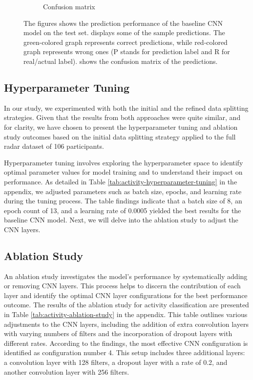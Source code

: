 \documentclass{l4proj}
\begin{document}
\begin{figure}[h]
\begin{subfigure}{0.4\textwidth}
        \caption{Confusion matrix}
        \label{fig:activity-initial-test-confusion-matrix}
    \end{subfigure}
  \caption{The figures shows the prediction performance of the baseline CNN model on the test set.  displays some of the sample predictions. The green-colored graph represents correct predictions, while red-colored graph represents wrong ones (P stands for prediction label and R for real/actual label). shows the confusion matrix of the predictions.}
  \label{fig:acitivity-initial-prediction-plots-and-confusion-matrix}
\end{figure}

\newpage

\subsection{Hyperparameter Tuning}
In our study, we experimented with both the initial and the refined data splitting strategies. Given that the results from both approaches were quite similar, and for clarity, we have chosen to present the hyperparameter tuning and ablation study outcomes based on the initial data splitting strategy applied to the full radar dataset of 106 participants.

Hyperparameter tuning involves exploring the hyperparameter space to identify optimal parameter values for model training and to understand their impact on performance. As detailed in Table \ref{tab:activity-hyperparameter-tuning} in the appendix, we adjusted parameters such as batch size, epochs, and learning rate during the tuning process. The table findings indicate that a batch size of 8, an epoch count of 13, and a learning rate of 0.0005 yielded the best results for the baseline CNN model. Next, we will delve into the ablation study to adjust the CNN layers.

\subsection{Ablation Study}
An ablation study investigates the model's performance by systematically adding or removing CNN layers. This process helps to discern the contribution of each layer and identify the optimal CNN layer configurations for the best performance outcome. The results of the ablation study for activity classification are presented in Table \ref{tab:activity-ablation-study} in the appendix. This table outlines various adjustments to the CNN layers, including the addition of extra convolution layers with varying numbers of filters and the incorporation of dropout layers with different rates. According to the findings, the most effective CNN configuration is identified as configuration number 4. This setup includes three additional layers: a convolution layer with 128 filters, a dropout layer with a rate of 0.2, and another convolution layer with 256 filters.
\end{document}

